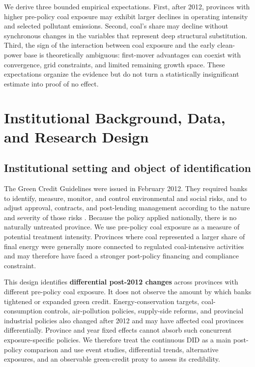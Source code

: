\documentclass[11pt]{article}
\begin{document}
We derive three bounded empirical expectations. First, after 2012, provinces with higher pre-policy coal exposure may exhibit larger declines in operating intensity and selected pollutant emissions. Second, coal's share may decline without synchronous changes in the variables that represent deep structural substitution. Third, the sign of the interaction between coal exposure and the early clean-power base is theoretically ambiguous: first-mover advantages can coexist with convergence, grid constraints, and limited remaining growth space. These expectations organize the evidence but do not turn a statistically insignificant estimate into proof of no effect.

\section{Institutional Background, Data, and Research Design}

\subsection{Institutional setting and object of identification}

The Green Credit Guidelines were issued in February 2012. They required banks to identify, measure, monitor, and control environmental and social risks, and to adjust approval, contracts, and post-lending management according to the nature and severity of those risks \parencite{cbrc2012}. Because the policy applied nationally, there is no naturally untreated province. We use pre-policy coal exposure as a measure of potential treatment intensity. Provinces where coal represented a larger share of final energy were generally more connected to regulated coal-intensive activities and may therefore have faced a stronger post-policy financing and compliance constraint.

This design identifies \textbf{differential post-2012 changes} across provinces with different pre-policy coal exposure. It does not observe the amount by which banks tightened or expanded green credit. Energy-conservation targets, coal-consumption controls, air-pollution policies, supply-side reforms, and provincial industrial policies also changed after 2012 and may have affected coal provinces differentially. Province and year fixed effects cannot absorb such concurrent exposure-specific policies. We therefore treat the continuous DID as a main post-policy comparison and use event studies, differential trends, alternative exposures, and an observable green-credit proxy to assess its credibility.
\end{document}
